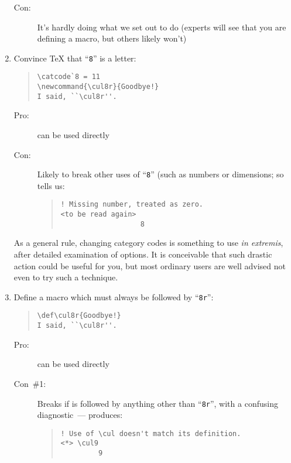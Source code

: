 \begin{enumerate}
\begin{description}
  \item[Con:] It's hardly doing what we set out to do (experts will
    see that you are defining a macro, but others likely won't)
  \end{description}
\item Convince \TeX{} that ``\texttt{8}'' is a letter:
\begin{quote}
\begin{verbatim}
\catcode`8 = 11 
\newcommand{\cul8r}{Goodbye!}
I said, ``\cul8r''.
\end{verbatim}
\end{quote}
  \begin{description}
  \item[Pro:]  can be used directly
  \item[Con:] Likely to break other uses of ``\texttt{8}'' (such as
    numbers or dimensions; so
     tells us:
\begin{quote}
\begin{verbatim}
! Missing number, treated as zero.
<to be read again> 
                   8
\end{verbatim}
\end{quote}
  \end{description}
  As a general rule, changing category codes is something to use
  \emph{in extremis}, after detailed examination of options.  It is
  conceivable that such drastic action could be useful for you, but
  most ordinary users are well advised not even to try such a
  technique.
\item Define a macro  which must always be followed by
  ``\texttt{8r}'':
\begin{quote}
\begin{verbatim}
\def\cul8r{Goodbye!}
I said, ``\cul8r''.
\end{verbatim}
\end{quote}
  \begin{description}
  \item[Pro:]  can be used directly
  \item[Con~\#1:] Breaks if  is followed by anything other
    than ``\texttt{8r}'', with a confusing diagnostic~---
     produces:
\begin{quote}
\begin{wideversion}
\begin{verbatim}
! Use of \cul doesn't match its definition.
<*> \cul9
         9
\end{verbatim}

\end{wideversion}
\end{quote}
\end{description}
\end{enumerate}
